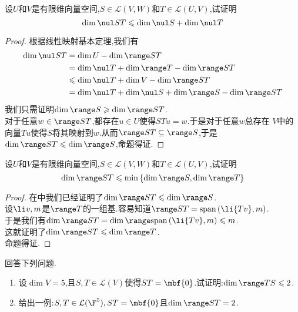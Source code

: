 \documentclass{ctexart}
\begin{document}
\begin{problem}[22.]
    设$U$和$V$是有限维向量空间,$S\in\mathcal{L}(V,W)$和$T\in\mathcal{L}(U,V)$,试证明
    $$\dim\nul ST\leqslant\dim\nul S+\dim\nul T$$
\end{problem}
\begin{proof}
    根据线性映射基本定理,我们有
    $$\begin{aligned}
        \dim\nul ST
        &= \dim U-\dim\range ST \\
        &= \dim\nul T+\dim\range T-\dim\range ST \\
        &\leqslant \dim\nul T+\dim V-\dim\range ST \\
        &= \dim\nul T+\dim\nul S+\dim\range S-\dim\range ST
    \end{aligned}$$
    我们只需证明$\dim\range S\geqslant\dim\range ST$.\\
    对于任意$w\in\range ST$,都存在$u\in U$使得$STu=w$.于是对于任意$w$总存在
    $V$中的向量$Tu$使得$S$将其映射到$w$.从而$\range ST\subseteq\range S$,于是$\dim\range ST\leqslant\dim\range S$,命题得证.
\end{proof}
\begin{problem}[23.]
    设$U$和$V$是有限维向量空间,$S\in\mathcal{L}(V,W)$和$T\in\mathcal{L}(U,V)$,试证明
    $$\dim\range ST\leqslant\min\left\{\dim\range S,\dim\range T\right\}$$
\end{problem}
\begin{proof}
    在中我们已经证明了$\dim\range ST\leqslant\dim\range S$.\\
    设$\li v,m$是$\range T$的一组基.容易知道$\range ST=\text{span}\left(\li {Tv},m\right)$.\\
    于是我们有$\dim\range ST=\dim\range\text{span}\left(\li{Tv},m\right)\leqslant m$.\\
    这就证明了$\dim\range ST\leqslant\dim\range T$.\\
    命题得证.
\end{proof}
\begin{problem}[24.]
    回答下列问题.
    \begin{enumerate}[label=\tbf{(\arabic*)}]
        \item 设$\dim V=5$,且$S,T\in\mathcal{L}(V)$使得$ST=\mbf{0}$.试证明:$\dim\range TS\leqslant 2$.
        \item 给出一例:$S,T\in\mathcal{L}(\F^5),ST=\mbf{0}$且$\dim\range ST=2$.
    \end{enumerate}
\end{problem}
\end{document}
